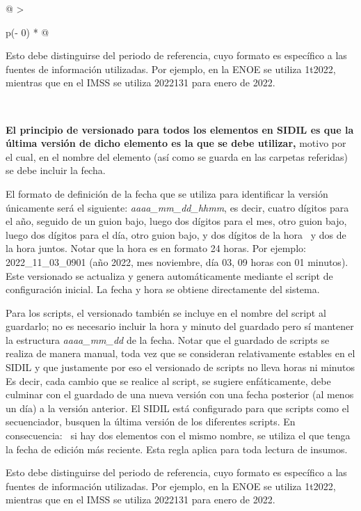 \documentclass[
]{article}
\begin{document}
\begin{longtable}[]{@{}
  >{\raggedright\arraybackslash}p{(\columnwidth - 0\tabcolsep) * }@{}}
\begin{minipage}[b]{\linewidth}
Esto debe distinguirse del periodo de referencia, cuyo formato es específico a las fuentes de información utilizadas. Por ejemplo, en la ENOE se utiliza 1t2022, mientras que en el IMSS se utiliza 2022131 para enero de 2022.
\end{minipage} \\
\midrule\noalign{}
\endfirsthead
\toprule\noalign{}
\begin{minipage}[b]{\linewidth}\raggedright
\textbf{El principio de versionado para todos los elementos en SIDIL es que la última versión de dicho elemento es la que se debe utilizar,} motivo por el cual, en el nombre del elemento (así como se guarda en las carpetas referidas) se debe incluir la fecha.

El formato de definición de la fecha que se utiliza para identificar la versión únicamente será el siguiente: \emph{aaaa\_mm\_dd\_hhmm}, es decir, cuatro dígitos para el año, seguido de un guion bajo, luego dos dígitos para el mes, otro guion bajo, luego dos dígitos para el día, otro guion bajo, y dos dígitos de la hora~ y dos de la hora juntos. Notar que la hora es en formato 24 horas. Por ejemplo: 2022\_11\_03\_0901 (año 2022, mes noviembre, día 03, 09 horas con 01 minutos). Este versionado se actualiza y genera automáticamente mediante el script de configuración inicial. La fecha y hora se obtiene directamente del sistema.

Para los scripts, el versionado también se incluye en el nombre del script al guardarlo; no es necesario incluir la hora y minuto del guardado pero sí mantener la estructura \emph{aaaa\_mm\_dd} de la fecha. Notar que el guardado de scripts se realiza de manera manual, toda vez que se consideran relativamente estables en el SIDIL y que justamente por eso el versionado de scripts no lleva horas ni minutos Es decir, cada cambio que se realice al script, se sugiere enfáticamente, debe culminar con el guardado de una nueva versión con una fecha posterior (al menos un día) a la versión anterior. El SIDIL está configurado para que scripts como el secuenciador, busquen la última versión de los diferentes scripts. En consecuencia:~ si hay dos elementos con el mismo nombre, se utiliza el que tenga la fecha de edición más reciente. Esta regla aplica para toda lectura de insumos.

Esto debe distinguirse del periodo de referencia, cuyo formato es específico a las fuentes de información utilizadas. Por ejemplo, en la ENOE se utiliza 1t2022, mientras que en el IMSS se utiliza 2022131 para enero de 2022.
\end{minipage} \\
\midrule\noalign{}
\endhead
\bottomrule\noalign{}
\endlastfoot
 \\
\end{longtable}
\end{document}

